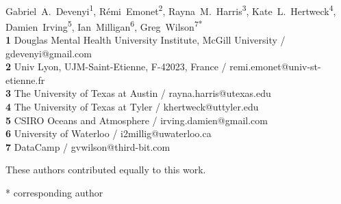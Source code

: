 \documentclass[10pt,letterpaper]{article}
\date{}
\begin{document}
\vspace*{0.2in}

\begin{flushleft}
{\Large
\textbf{} %
}
\newline
\\
{Gabriel~A.~Devenyi}\textsuperscript{1{\ddag}},
{R\'{e}mi~Emonet}\textsuperscript{2{\ddag}},
{Rayna~M.~Harris}\textsuperscript{3{\ddag}},
{Kate~L.~Hertweck}\textsuperscript{4{\ddag}},
{Damien~Irving}\textsuperscript{5{\ddag}},
{Ian~Milligan}\textsuperscript{6{\ddag}},
{Greg~Wilson}\textsuperscript{7{\ddag}*}
\\
\bigskip
\textbf{1} Douglas Mental Health University Institute, McGill University / gdevenyi@gmail.com \\
\textbf{2} Univ Lyon, UJM-Saint-Etienne, F-42023, France / remi.emonet@univ-st-etienne.fr \\
\textbf{3} The University of Texas at Austin / rayna.harris@utexas.edu \\
\textbf{4} The University of Texas at Tyler / khertweck@uttyler.edu \\
\textbf{5} CSIRO Oceans and Atmosphere / irving.damien@gmail.com \\
\textbf{6} University of Waterloo / i2millig@uwaterloo.ca \\
\textbf{7} DataCamp / gvwilson@third-bit.com \\

\bigskip

%
%
{\ddag} These authors contributed equally to this work.





* corresponding author

\end{flushleft}
\end{document}
